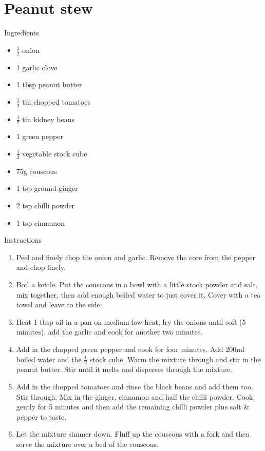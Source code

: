 \documentclass[../dinner.tex]{subfiles}
\begin{document}
	\pagestyle{fancy}
	\fancyhf{}
	\newpage
	\section{Peanut stew}
	\lhead{}
	{\Large Ingredients}
	\begin{multicols}{2}
		\begin{itemize}
			\item \(\frac{1}{2}\) onion
			\item 1 garlic clove
			\item 1 tbsp peanut butter
			\item \(\frac{1}{2}\) tin chopped tomatoes
			\item \(\frac{1}{2}\) tin kidney beans
			\item 1 green pepper
		\end{itemize}
		\columnbreak
		\begin{itemize}
			\item \(\frac{1}{2}\) vegetable stock cube
			\item 75g couscous
			\item 1 tsp ground ginger
			\item 2 tsp chilli powder
			\item 1 tsp cinnamon
		\end{itemize}
	\end{multicols}
	
	{\Large Instructions}
	\begin{enumerate}
		\item Peel and finely chop the onion and garlic. Remove the core from the pepper and chop finely.
		\item Boil a kettle. Put the couscous in a bowl with a little stock powder and salt, mix together, then add enough boiled water to just cover it. Cover with a tea towel and leave to the side.
		\item Heat 1 tbsp oil in a pan on medium-low heat, fry the onions until soft (5 minutes), add the garlic and cook for another two minutes.
		\item Add in the chopped green pepper and cook for four minutes. Add 200ml boiled water and the \(\frac{1}{2}\) stock cube. Warm the mixture through and stir in the peanut butter. Stir until it melts and disperses through the mixture.
		\item Add in the chopped tomatoes and rinse the black beans and add them too. Stir through. Mix in the ginger, cinnamon and half the chilli powder. Cook gently for 5 minutes and then add the remaining chilli powder plus salt \& pepper to taste.
		\item Let the mixture simmer down. Fluff up the couscous with a fork and then serve the mixture over a bed of the couscous.
	\end{enumerate}
\end{document}
